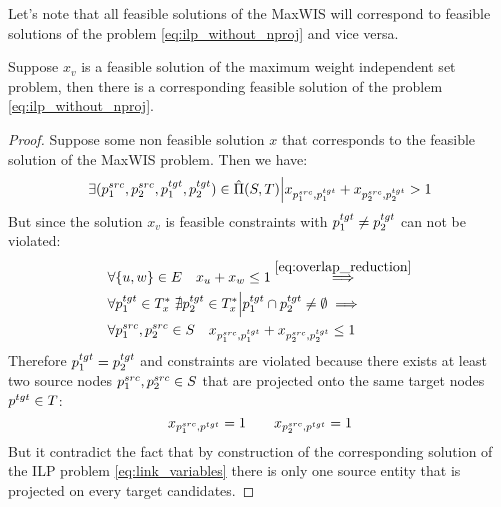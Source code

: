 Let's note that all feasible solutions of the MaxWIS will correspond to feasible solutions of the
problem \ref{eq:ilp_without_nproj} and vice versa.

\begin{lemma} \label{lemma:maxis_f_implies_ilp}
  Suppose \( x_v \) is a feasible solution of the maximum weight independent set problem, then there is a
  corresponding feasible solution of the problem \eqref{eq:ilp_without_nproj}.
\end{lemma}
\begin{proof}
  Suppose some non feasible solution \( x \) that corresponds to the feasible solution of the
  MaxWIS problem. Then we have:
  \[
    \exists (p_1^{src}, p_2^{src}, p_1^{tgt}, p_2^{tgt}) \in \hat{\Pi}(S, T) \Big|
    x_{p_1^{src}, p_1^{tgt}} + x_{p_2^{src}, p_2^{tgt}} > 1
  \]
  But since the solution \( x_v \) is feasible constraints with  \( p_1^{tgt} \neq p_2^{tgt} \) can not be violated:
  \begin{align*}
    & \forall \{ u, w \} \in E \quad x_u + x_w \leq 1 \stackrel{\eqref{eq:overlap_reduction}}{\implies}                  \\
    & \forall p_1^{tgt} \in T^*_x \; \nexists p_2^{tgt} \in T^*_x \Big| p_1^{tgt} \cap p_2^{tgt} \neq \emptyset \implies \\
    & \forall p_1^{src}, p_2^{src} \in S \quad x_{p_1^{src}, p_1^{tgt}} + x_{p_2^{src}, p_2^{tgt}} \leq 1
  \end{align*}
  Therefore \( p_1^{tgt} = p_2^{tgt} \) and constraints are violated because there exists
  at least two source nodes \( p_1^{src}, p_2^{src} \in S \) that are projected onto the same target nodes \( p^{tgt} \in T \):
  \[
    x_{p_1^{src}, p^{tgt}} = 1 \qquad x_{p_2^{src}, p^{tgt}} = 1
  \]
  But it contradict the fact that by construction of the corresponding solution of the ILP problem \eqref{eq:link_variables}
  there is only one source entity that is projected on every target candidates.
\end{proof}

